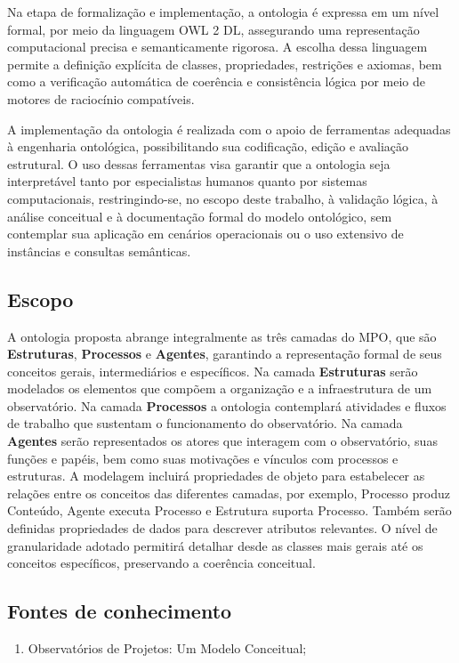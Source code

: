 Na etapa de formalização e implementação, a ontologia é expressa em um nível formal, por meio da linguagem OWL 2 DL, assegurando uma representação computacional precisa e semanticamente rigorosa. A escolha dessa linguagem permite a definição explícita de classes, propriedades, restrições e axiomas, bem como a verificação automática de coerência e consistência lógica por meio de motores de raciocínio compatíveis.

A implementação da ontologia é realizada com o apoio de ferramentas adequadas à engenharia ontológica, possibilitando sua codificação, edição e avaliação estrutural. O uso dessas ferramentas visa garantir que a ontologia seja interpretável tanto por especialistas humanos quanto por sistemas computacionais, restringindo-se, no escopo deste trabalho, à validação lógica, à análise conceitual e à documentação formal do modelo ontológico, sem contemplar sua aplicação em cenários operacionais ou o uso extensivo de instâncias e consultas semânticas.

\subsection{Escopo}
A ontologia proposta abrange integralmente as três camadas do MPO\cite{vieira2022thesis}, que são \textbf{Estruturas}, \textbf{Processos} e \textbf{Agentes}, garantindo a representação formal de seus conceitos gerais, intermediários e específicos. Na camada \textbf{Estruturas} serão modelados os elementos que compõem a organização e a infraestrutura de um observatório. Na camada \textbf{Processos} a ontologia contemplará atividades e fluxos de trabalho que sustentam o funcionamento do observatório. Na camada \textbf{Agentes} serão representados os atores que interagem com o observatório, suas funções e papéis, bem como suas motivações e vínculos com processos e estruturas. A modelagem incluirá propriedades de objeto para estabelecer as relações entre os conceitos das diferentes camadas, por exemplo, Processo produz Conteúdo, Agente executa Processo e Estrutura suporta Processo. Também serão definidas propriedades de dados para descrever atributos relevantes. O nível de granularidade adotado permitirá detalhar desde as classes mais gerais até os conceitos específicos, preservando a coerência conceitual.

\subsection{Fontes de conhecimento}
\begin{enumerate}
    \item Observatórios de Projetos: Um Modelo Conceitual\cite{vieira2022thesis};
\end{enumerate}

